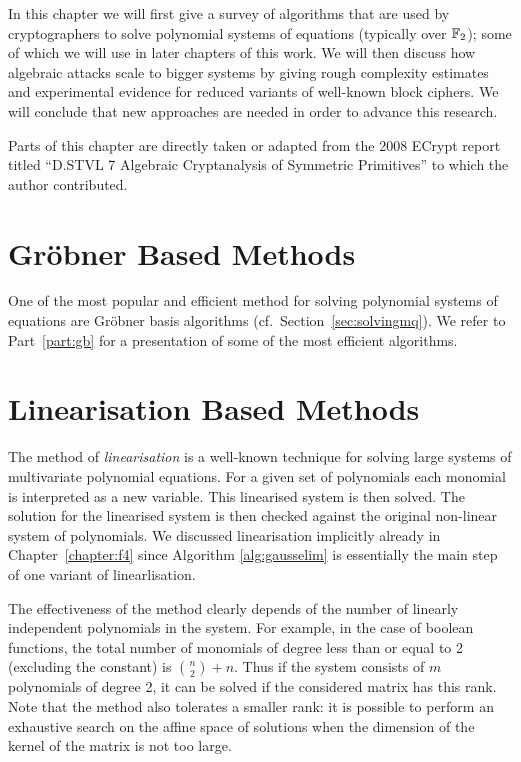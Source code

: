 In this chapter we will first give a survey of algorithms that are used by cryptographers to solve polynomial systems of equations (typically over $\mathbb{F}_2$); some of which we will use in later chapters of this work. We will then discuss how algebraic attacks scale to bigger systems by giving rough complexity estimates and experimental evidence for reduced variants of well-known block ciphers. We will conclude that new approaches are needed in order to advance this research.

Parts of this chapter are directly taken or adapted from the 2008 ECrypt report titled ``D.STVL 7 Algebraic Cryptanalysis of Symmetric Primitives'' \cite{d-stvl7} to which the author contributed.

\section{\texorpdfstring{Gröbner}{Groebner} Based Methods}

One of the most popular and efficient method for solving  polynomial systems of equations are Gröbner basis algorithms (cf.\ Section~\ref{sec:solvingmq}). We refer to Part~\ref{part:gb} for a presentation of some of the most efficient algorithms.

\section{Linearisation Based Methods}

The method of \emph{linearisation} is a well-known technique for solving large systems of multivariate polynomial equations. For a given set of polynomials each monomial is interpreted as a new variable. This linearised system is then solved. The solution for the linearised system is then checked against the original non-linear system of polynomials. We discussed linearisation implicitly already in Chapter~\ref{chapter:f4} since Algorithm \ref{alg:gausselim} is essentially the main step of one variant of linearlisation.

The effectiveness of the method clearly depends of the number of linearly independent polynomials in the system. For example, in the case of boolean functions, the total number of monomials of degree less than or equal to 2 (excluding the constant) is $\binom{n}{2}+n$. Thus if the system consists of $m$ polynomials of degree 2, it can be solved if the considered matrix has this rank. Note that the method also tolerates a smaller rank: it is possible to perform an exhaustive search on the affine space of solutions when the dimension of the kernel of the matrix is not too large.

